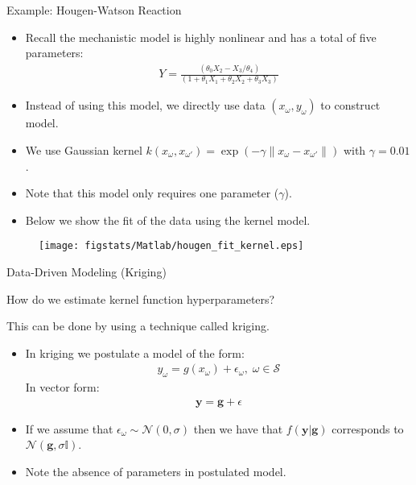 \documentclass[9pt]{beamer}
\begin{document}
%
\begin{frame}{Example: Hougen-Watson Reaction}

\begin{itemize}
\item Recall the mechanistic model is highly nonlinear and has a total of five parameters:
\begin{align*}
Y=\frac{(\theta_0X_2-X_3/\theta_4)}{(1+\theta_1X_1+\theta_2X_2+\theta_3X_3)}
\end{align*}
\item Instead of using this model, we directly use data $(x_\omega,y_\omega)$ to construct model. 
\item We use Gaussian kernel $k(x_\omega,x_{\omega'})=\exp(-\gamma\|x_\omega-x_{\omega'}\|)$ with $\gamma=0.01$. 
\item Note that this model only requires one parameter ($\gamma$). 
\item Below we show the fit of the data using the kernel model. 
\end{itemize}

\begin{figure}[!htb]
    \centering
	\texttt{[image: figstats/Matlab/hougen\_fit\_kernel.eps]}
\end{figure}


\end{frame}


\begin{frame}{Data-Driven Modeling (Kriging)}

\begin{block}{}
How do we estimate kernel function hyperparameters?
\end{block}

This can be done by using a technique called kriging. 
\begin{itemize}
\item In kriging we postulate a model of the form:
\begin{align*}
{y}_\omega = g(x_\omega)+\epsilon_\omega,\; \omega \in \mathcal{S}
\end{align*}
In vector form:
\begin{align*}
\mathbf{y}= \mathbf{g}+\epsilon
\end{align*}
\item If we assume that $\epsilon_\omega \sim \mathcal{N}(0,\sigma)$ then we have that $f(\mathbf{y}|\mathbf{g})$ corresponds to $\mathcal{N}(\mathbf{g},\sigma \mathbb{I})$. 
\item Note the absence of parameters in postulated model. 
\end{itemize}


\end{frame}
\end{document}
